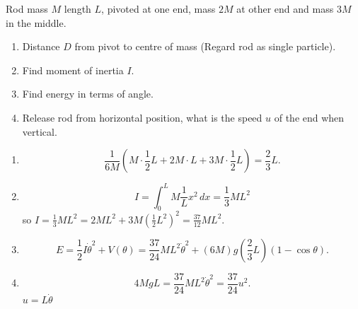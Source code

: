 \documentclass[10pt, a4paper]{article}
\begin{document}
\begin{problem}[2024 5.2.]
    Rod mass $M$ length $L$,
    pivoted at one end,
    mass $2M$ at other end and mass $3M$ in the middle.

    \begin{enumerate}[label = (\roman*)]
        \item Distance $D$ from pivot to centre of mass
        (Regard rod as single particle).

        \item Find moment of inertia $I$.

        \item Find energy in terms of angle.

        \item Release rod from horizontal position,
        what is the speed $u$ of the end when vertical.
    \end{enumerate}

    \begin{solution}
        \begin{enumerate}[label = (\roman*)]
            \item 
            \[
            \frac{1}{6M}\left(M \cdot \frac{1}{2}L + 2M\cdot L + 3M \cdot \frac{1}{2}L\right) = \frac{2}{3}L.
            \]

            \item
            \[
            I = \int_{0}^{L}M\frac{1}{L}x ^ 2\,dx = \frac{1}{3}ML ^ 2
            \]
            so $I = \frac{1}{3}ML ^ 2 = 2ML ^ 2 + 3M\left(\frac{1}{2}L ^ 2\right) ^ 2 = \frac{37}{12}ML ^ 2$.

            \item
            \[
            E = \frac{1}{2}I\dot{\theta} ^ 2 + V(\theta) = \frac{37}{24}ML ^ 2\dot{\theta} ^ 2 + (6M)g\left(\frac{2}{3}L\right)(1 - \cos{\theta}).
            \]

            \item
            \[
            4MgL = \frac{37}{24}ML ^ 2\dot{\theta} ^ 2 = \frac{37}{24}u ^ 2.
            \]
            $u = L\dot{\theta}$
        \end{enumerate}
    \end{solution}
\end{problem}
\end{document}

